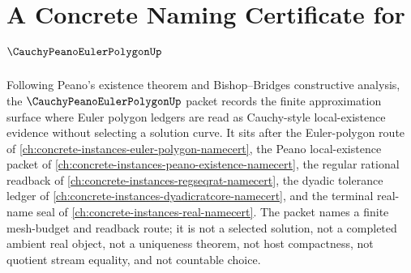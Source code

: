 \chapter{A Concrete Naming Certificate for $\CauchyPeanoEulerPolygonUp$}
\label{ch:concrete-instances-cauchy-peano-euler-polygon-namecert}

Following Peano's existence theorem and Bishop--Bridges constructive analysis, the $\CauchyPeanoEulerPolygonUp$ packet records the finite approximation surface where Euler polygon ledgers are read as Cauchy-style local-existence evidence without selecting a solution curve. It sits after the Euler-polygon route of \autoref{ch:concrete-instances-euler-polygon-namecert}, the Peano local-existence packet of \autoref{ch:concrete-instances-peano-existence-namecert}, the regular rational readback of \autoref{ch:concrete-instances-regseqrat-namecert}, the dyadic tolerance ledger of \autoref{ch:concrete-instances-dyadicratcore-namecert}, and the terminal real-name seal of \autoref{ch:concrete-instances-real-namecert}. The packet names a finite mesh-budget and readback route; it is not a selected solution, not a completed ambient real object, not a uniqueness theorem, not host compactness, not quotient stream equality, and not countable choice.

